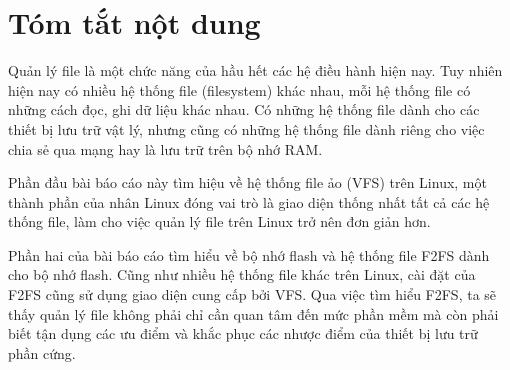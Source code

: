 \chapter*{Tóm tắt nột dung}%
%
Quản lý file là một chức năng của hầu hết các hệ điều hành hiện nay. Tuy nhiên
hiện nay có nhiều hệ thống file (filesystem) khác nhau, mỗi hệ thống file có
những cách đọc, ghi dữ liệu khác nhau. Có những hệ thống file dành cho các
thiết bị lưu trữ vật lý, nhưng cũng có những hệ thống file dành riêng cho việc
chia sẻ qua mạng hay là lưu trữ trên bộ nhớ RAM.

Phần đầu bài báo cáo này tìm hiệu về hệ thống file ảo (VFS) trên Linux, một thành phần
của nhân Linux đóng vai trò là giao diện thống nhất tất cả các hệ thống file,
làm cho việc quản lý file trên Linux trở nên đơn giản hơn.

Phần hai của bài báo cáo tìm hiểu về bộ nhớ flash và hệ thống file F2FS dành
cho bộ nhớ flash. Cũng như nhiều hệ thống file khác trên Linux, cài đặt của
F2FS cũng sử dụng giao diện cung cấp bởi VFS. Qua việc tìm hiểu F2FS, ta sẽ
thấy quản lý file không phải chỉ cần quan tâm đến mức phần mềm mà còn phải biết tận dụng
các ưu điểm và khắc phục các nhược điểm của thiết bị lưu trữ phần cứng.
